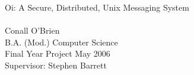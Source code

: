 
\thispagestyle{empty}

\ \vspace{6.5cm}

\hspace{3cm}\parbox{10cm}{
\hspace{35mm} \Huge \OghamOr \normalsize \\
\vspace{10mm} \\
Oi: A Secure, Distributed, Unix Messaging System \\
\hspace{10mm} \\
Conall O'Brien  \\
B.A. (Mod.) Computer Science \\
Final Year Project May 2006 \\ 
Supervisor: Stephen Barrett \\
}

\vfill
\pagebreak

\thispagestyle{empty}

\pagebreak
